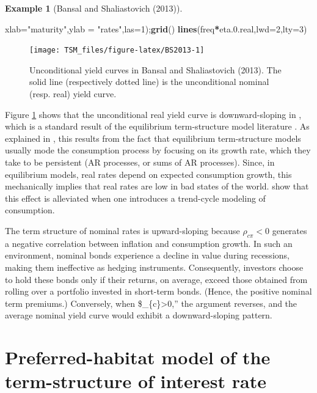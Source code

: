 \documentclass[
  12pt,
]{book}
\newenvironment{Shaded}{\begin{snugshade}}{\end{snugshade}}
\newcommand{\AttributeTok}[1]{\textcolor[rgb]{0.13,0.29,0.53}{#1}}
\newcommand{\DecValTok}[1]{\textcolor[rgb]{0.00,0.00,0.81}{#1}}
\newcommand{\FloatTok}[1]{\textcolor[rgb]{0.00,0.00,0.81}{#1}}
\newcommand{\FunctionTok}[1]{\textcolor[rgb]{0.13,0.29,0.53}{\textbf{#1}}}
\newcommand{\NormalTok}[1]{#1}
\newcommand{\SpecialCharTok}[1]{\textcolor[rgb]{0.81,0.36,0.00}{\textbf{#1}}}
\newcommand{\StringTok}[1]{\textcolor[rgb]{0.31,0.60,0.02}{#1}}
\theoremstyle{definition}
\theoremstyle{definition}
\newtheorem{example}{Example}[chapter]
\theoremstyle{definition}
\theoremstyle{definition}
\theoremstyle{remark}
\begin{document}
\begin{example}[Bansal and Shaliastovich (2013)]
\begin{Shaded}
\begin{Highlighting}[]
     \AttributeTok{xlab=}\StringTok{"maturity"}\NormalTok{,}\AttributeTok{ylab =} \StringTok{"rates"}\NormalTok{,}\AttributeTok{las=}\DecValTok{1}\NormalTok{);}\FunctionTok{grid}\NormalTok{()}
\FunctionTok{lines}\NormalTok{(freq}\SpecialCharTok{*}\NormalTok{eta.}\FloatTok{0.}\NormalTok{real,}\AttributeTok{lwd=}\DecValTok{2}\NormalTok{,}\AttributeTok{lty=}\DecValTok{3}\NormalTok{)}
\end{Highlighting}
\end{Shaded}

\begin{figure}
\texttt{[image: TSM\_files/figure-latex/BS2013-1]} \caption{Unconditional yield curves in Bansal and Shaliastovich (2013). The solid line (respectively dotted line) is the unconditional nominal (resp. real) yield curve.}\label{fig:BS2013}
\end{figure}

\end{example}

Figure \ref{fig:BS2013} shows that the unconditional real yield curve is downward-sloping in \citet{Bansal_Shaliastovich_2013}, which is a standard result of the equilibrium term-structure model literature \citep{Piazzesi_Schneider_2007}. As explained in \citet{Bletzinger_Lemke_Renne_2024}, this results from the fact that equilibrium term-structure models usually mode the consumption process by focusing on its growth rate, which they take to be persistent (AR processes, or sums of AR processes). Since, in equilibrium models, real rates depend on expected consumption growth, this mechanically implies that real rates are low in bad states of the world. \citet{Bletzinger_Lemke_Renne_2024} show that this effect is alleviated when one introduces a trend-cycle modeling of consumption.

The term structure of nominal rates is upward-sloping because \(\rho_{c\pi}<0\) generates a negative correlation between inflation and consumption growth. In such an environment, nominal bonds experience a decline in value during recessions, making them ineffective as hedging instruments. Consequently, investors choose to hold these bonds only if their returns, on average, exceed those obtained from rolling over a portfolio invested in short-term bonds. (Hence, the positive nominal term premiums.) Conversely, when \$\rho\_\{c\pi\}\textgreater0,'' the argument reverses, and the average nominal yield curve would exhibit a downward-sloping pattern.

\hypertarget{PHabitat}{%
\section{Preferred-habitat model of the term-structure of interest rate}\label{PHabitat}}
\end{document}
